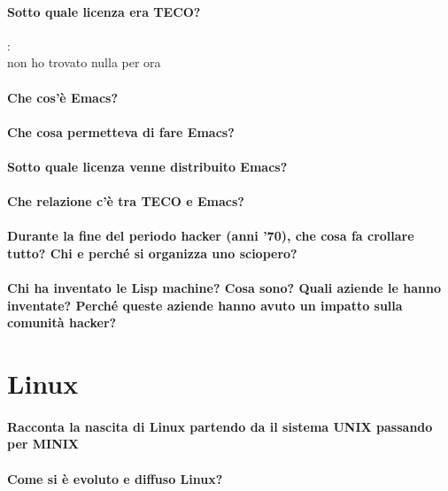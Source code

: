 \documentclass[a4paper]{article}
\begin{document}
		\paragraph{Sotto quale licenza era TECO?}:\\
		non ho trovato nulla per ora
	
		\paragraph{Che cos'è Emacs?} %
	
		\paragraph{Che cosa permetteva di fare Emacs?}
	
		\paragraph{Sotto quale licenza venne distribuito Emacs?}

		\paragraph{Che relazione c'è tra TECO e Emacs?}
		
		
		\paragraph{Durante la fine del periodo hacker (anni '70), che cosa fa crollare tutto? Chi e perché si organizza uno sciopero?}
		
		
		\paragraph{Chi ha inventato le Lisp machine? Cosa sono? Quali aziende le hanno inventate? Perché queste aziende hanno avuto un impatto sulla comunità hacker?}
	
	

	\section{Linux}
		
		\paragraph{Racconta la nascita di Linux partendo da il sistema UNIX passando per MINIX}
		
		\paragraph{Come si è evoluto e diffuso Linux?}
	
\end{document}
